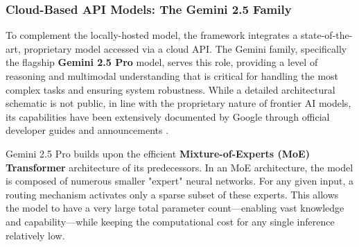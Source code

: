 
\subsubsection{Cloud-Based API Models: The Gemini 2.5 Family}

To complement the locally-hosted model, the framework integrates a state-of-the-art, proprietary model accessed via a cloud API. The Gemini family, specifically the flagship \textbf{Gemini 2.5 Pro} model, serves this role, providing a level of reasoning and multimodal understanding that is critical for handling the most complex tasks and ensuring system robustness. While a detailed architectural schematic is not public, in line with the proprietary nature of frontier AI models, its capabilities have been extensively documented by Google through official developer guides and announcements \cite{FIND_CITATION_PLEASE}.

Gemini 2.5 Pro builds upon the efficient \textbf{Mixture-of-Experts (MoE) Transformer} architecture of its predecessors. In an MoE architecture, the model is composed of numerous smaller "expert" neural networks. For any given input, a routing mechanism activates only a sparse subset of these experts. This allows the model to have a very large total parameter count—enabling vast knowledge and capability—while keeping the computational cost for any single inference relatively low.

